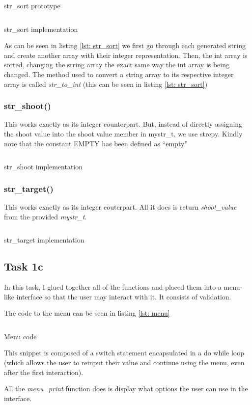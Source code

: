 \documentclass[a4paper, 12pt, titlepage]{article}
\newenvironment{code}{\captionsetup{type=listing}}{}
\newcommand{\sourcecode}[3]{
    \begin{code}
      \inputminted[linenos,numbersep=5pt,gobble=0,frame=lines,framesep=2mm,]{c}{#1}
        \caption{#2}
        \label{lst: #3}
    \end{code}
  }
\begin{document}
\begin{onehalfspacing}
  \sourcecode{snippets/str_sort_header.c}{str\_sort prototype}{str_sort_prototype}
  \sourcecode{snippets/str_sort.c}{str\_sort implementation}{str_sort}

  As can be seen in listing \ref{lst: str_sort} we first go through each generated string and create another array with their integer representation. Then, the int array is sorted, changing the string array the exact same way the int array is being changed. The method used to convert a string array to its respective integer array is called \emph{str\_to\_int} (this can be seen in listing \ref{lst: str_sort})

  \subsubsection{str\_shoot()}
  This works exactly as its integer counterpart. But, instead of directly assigning the shoot value into the shoot value member in mystr\_t, we use strcpy. Kindly note that the constant EMPTY has been defined as ``empty''

  \sourcecode{snippets/str_shoot.c}{str\_shoot implementation}{str_shoot}

  \subsubsection{str\_target()}
  This works exactly as its integer couterpart. All it does is return \emph{shoot\_value} from the provided \emph{mystr\_t}.

  \sourcecode{snippets/str_target.c}{str\_target implementation}{str_target}

  \subsection{Task 1c}
  In this task, I glued together all of the functions and placed them into a menu-like interface so that the user may interact with it. It consists of validation.

  The code to the menu can be seen in listing \ref{lst: menu}

  \sourcecode{snippets/menu.c}{Menu code}{menu}

  This snippet is composed of a switch statement encapsulated in a do while loop (which allows the user to reinput their value and continue using the menu, even after the first interaction).

  All the \emph{menu\_print} function does is display what options the user can use in the interface.


\end{onehalfspacing}
\end{document}
